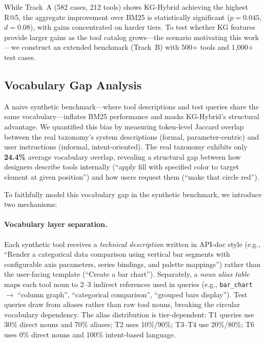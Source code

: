 \documentclass[11pt,a4paper]{article}
\begin{document}
While Track~A (582 cases, 212 tools) shows KG-Hybrid achieving the highest R@5, the aggregate improvement over BM25 is statistically significant ($p=0.045$, $d=0.08$), with gains concentrated on harder tiers. To test whether KG features provide larger gains as the tool catalog grows---the scenario motivating this work---we construct an extended benchmark (Track~B) with 500+ tools and 1,000+ test cases.

\subsection{Vocabulary Gap Analysis}

A naive synthetic benchmark---where tool descriptions and test queries share the same vocabulary---inflates BM25 performance and masks KG-Hybrid's structural advantage. We quantified this bias by measuring token-level Jaccard overlap between the real taxonomy's system descriptions (formal, parameter-centric) and user instructions (informal, intent-oriented). The real taxonomy exhibits only \textbf{24.4\%} average vocabulary overlap, revealing a structural gap between how designers describe tools internally (``apply fill with specified color to target element at given position'') and how users request them (``make that circle red'').

To faithfully model this vocabulary gap in the synthetic benchmark, we introduce two mechanisms:

\paragraph{Vocabulary layer separation.}
Each synthetic tool receives a \textit{technical description} written in API-doc style (e.g., ``Render a categorical data comparison using vertical bar segments with configurable axis parameters, series bindings, and palette mappings'') rather than the user-facing template (``Create a bar chart''). Separately, a \textit{noun alias table} maps each tool noun to 2--3 indirect references used in queries (e.g., \texttt{bar\_chart} $\rightarrow$ ``column graph'', ``categorical comparison'', ``grouped bars display''). Test queries draw from aliases rather than raw tool nouns, breaking the circular vocabulary dependency. The alias distribution is tier-dependent: T1 queries use 30\% direct nouns and 70\% aliases; T2 uses 10\%/90\%; T3--T4 use 20\%/80\%; T6 uses 0\% direct nouns and 100\% intent-based language.
\end{document}

